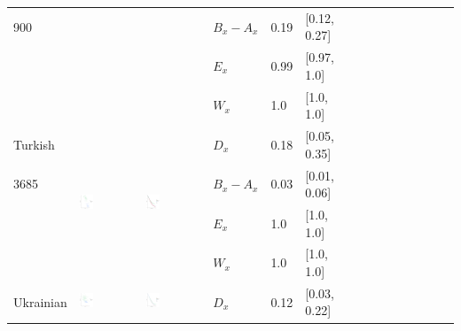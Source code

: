 \documentclass[11pt,letterpaper]{article}
\begin{document}
\begin{longtable}{lllllllllllllll}
900  &    &    &  $B_x-A_x$  &  0.19  &  [0.12, 0.27]  \\ 
  &    &    &  $E_x$  &  0.99  &  [0.97, 1.0]  \\ 
  &    &    &  $W_x$  &  1.0  &  [1.0, 1.0]  \\ [10.25ex] \hline
Turkish  &  \multirow{4}{*}{\includegraphics[width=0.25\textwidth]{figures/Turkish-entropy-memory.pdf}}  &  \multirow{4}{*}{\includegraphics[width=0.25\textwidth]{figures/Turkish-listener-surprisal-memory.pdf}}  &  $D_x$  &  0.18  &  [0.05, 0.35]  \\ 
3685  &    &    &  $B_x-A_x$  &  0.03  &  [0.01, 0.06]  \\ 
  &    &    &  $E_x$  &  1.0  &  [1.0, 1.0]  \\ 
  &    &    &  $W_x$  &  1.0  &  [1.0, 1.0]  \\ [10.25ex] \hline
Ukrainian  &  \multirow{4}{*}{\includegraphics[width=0.25\textwidth]{figures/Ukrainian-entropy-memory.pdf}}  &  \multirow{4}{*}{\includegraphics[width=0.25\textwidth]{figures/Ukrainian-listener-surprisal-memory.pdf}}  &  $D_x$  &  0.12  &  [0.03, 0.22]  \\ 

\end{longtable}
\end{document}
